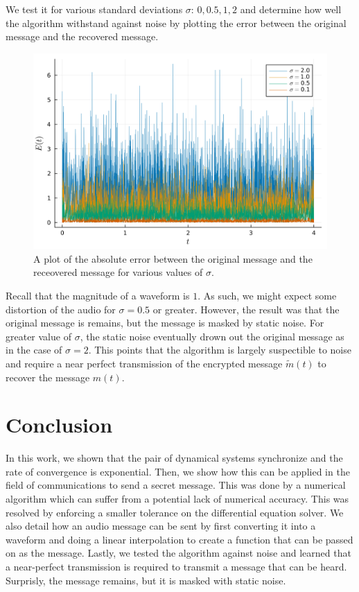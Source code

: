 \documentclass[12pt]{article}
\begin{document}
    We test it for various standard deviations $\sigma$: $0, 0.5, 1, 2$ and determine how well the algorithm withstand against noise by plotting the error between the original message and the recovered message. 
    \begin{figure}[H]
        \includegraphics[width=\linewidth]{error_plot_noise.png}
        \centering
        \caption{A plot of the absolute error between the original message and the receovered message for various values of $\sigma$.}
    \end{figure}
    Recall that the magnitude of a waveform is $1$. As such, we might expect some distortion of the audio for $\sigma = 0.5$ or greater. However, the result was that the original message is remains, but the message is masked by static noise. For greater value of $\sigma$, the static noise eventually drown out the original message as in the case of $\sigma = 2$. This points that the algorithm is largely suspectible to noise and require a near perfect transmission of the encrypted message $\widetilde{m}(t)$ to recover the message $m(t)$. 


    \section{Conclusion}
    In this work, we shown that the pair of dynamical systems synchronize and the rate of convergence is exponential. Then, we show how this can be applied in the field of communications to send a secret message. This was done by a numerical algorithm which can suffer from a potential lack of numerical accuracy. This was resolved by enforcing a smaller tolerance on the differential equation solver. We also detail how an audio message can be sent by first converting it into a waveform and doing a linear interpolation to create a function that can be passed on as the message. Lastly, we tested the algorithm against noise and learned that a near-perfect transmission is required to transmit a message that can be heard. Surprisly, the message remains, but it is masked with static noise. 
  \newpage    
    \printbibliography
\end{document}

